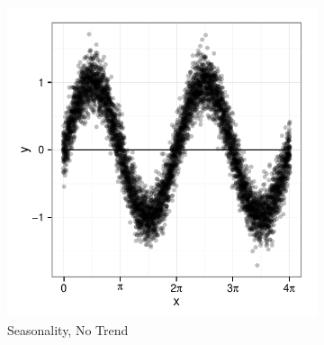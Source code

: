 \documentclass[11pt]{isuthesis}\usepackage[]{graphicx}\usepackage[]{color}
\newenvironment{knitrout}{}{} %
\begin{document}
\begin{figure}[h!tbp]\centering
\begin{subfigure}[b]{.31\linewidth}
  \centering
\begin{knitrout}
\color{fgcolor}

{\centering \includegraphics[width=\linewidth]{Figure/sineIllusion/fig-simulation1Sine-1} 

}



\end{knitrout}
  \caption{\small Seasonality, No Trend}
  \label{simulation1}
\end{subfigure}
\begin{subfigure}[b]{.31\linewidth}\centering
\begin{knitrout}
\color{fgcolor}


\end{knitrout}
\end{subfigure}
\end{figure}
\end{document}
